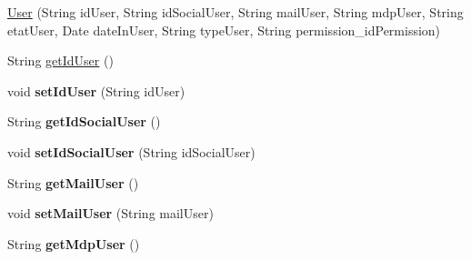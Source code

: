 \begin{DoxyCompactItemize}
\item 
\hyperlink{classcom_1_1ecetech_1_1bti4_1_1itproject_1_1classified_1_1beans_1_1_user_a1c64ba162d05851b1816cdae8f1d2e84}{User} (String id\+User, String id\+Social\+User, String mail\+User, String mdp\+User, String etat\+User, Date date\+In\+User, String type\+User, String permission\+\_\+id\+Permission)
\item 
String \hyperlink{classcom_1_1ecetech_1_1bti4_1_1itproject_1_1classified_1_1beans_1_1_user_a188f7ab8312cde857251e04343459b90}{get\+Id\+User} ()
\item 
void {\bfseries set\+Id\+User} (String id\+User)\hypertarget{classcom_1_1ecetech_1_1bti4_1_1itproject_1_1classified_1_1beans_1_1_user_a4685ee08d69755a377312006de72c863}{}\label{classcom_1_1ecetech_1_1bti4_1_1itproject_1_1classified_1_1beans_1_1_user_a4685ee08d69755a377312006de72c863}

\item 
String {\bfseries get\+Id\+Social\+User} ()\hypertarget{classcom_1_1ecetech_1_1bti4_1_1itproject_1_1classified_1_1beans_1_1_user_add20572896528d7e7db3e7d45f1dbf0b}{}\label{classcom_1_1ecetech_1_1bti4_1_1itproject_1_1classified_1_1beans_1_1_user_add20572896528d7e7db3e7d45f1dbf0b}

\item 
void {\bfseries set\+Id\+Social\+User} (String id\+Social\+User)\hypertarget{classcom_1_1ecetech_1_1bti4_1_1itproject_1_1classified_1_1beans_1_1_user_abd30ec28ff6993c845849a551a16c0a4}{}\label{classcom_1_1ecetech_1_1bti4_1_1itproject_1_1classified_1_1beans_1_1_user_abd30ec28ff6993c845849a551a16c0a4}

\item 
String {\bfseries get\+Mail\+User} ()\hypertarget{classcom_1_1ecetech_1_1bti4_1_1itproject_1_1classified_1_1beans_1_1_user_a710c0f8322d6797193349a70b24b49c4}{}\label{classcom_1_1ecetech_1_1bti4_1_1itproject_1_1classified_1_1beans_1_1_user_a710c0f8322d6797193349a70b24b49c4}

\item 
void {\bfseries set\+Mail\+User} (String mail\+User)\hypertarget{classcom_1_1ecetech_1_1bti4_1_1itproject_1_1classified_1_1beans_1_1_user_ada9a114c53873caa28f73efddda18b81}{}\label{classcom_1_1ecetech_1_1bti4_1_1itproject_1_1classified_1_1beans_1_1_user_ada9a114c53873caa28f73efddda18b81}

\item 
String {\bfseries get\+Mdp\+User} ()\hypertarget{classcom_1_1ecetech_1_1bti4_1_1itproject_1_1classified_1_1beans_1_1_user_aa93ea4b42a7b37823b336c7a768d03e4}{}\label{classcom_1_1ecetech_1_1bti4_1_1itproject_1_1classified_1_1beans_1_1_user_aa93ea4b42a7b37823b336c7a768d03e4}


\end{DoxyCompactItemize}
